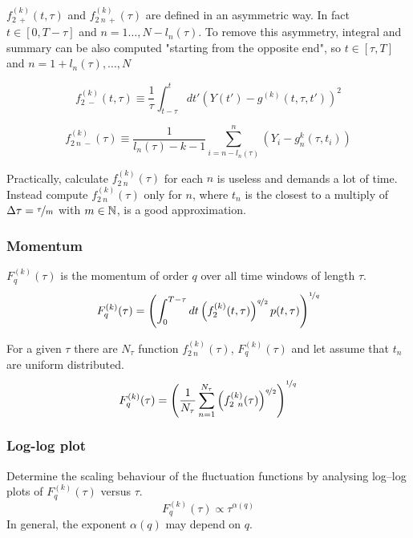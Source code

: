 $f_{2 \ +}^{( k )}( t, \tau )$ and $f_{2\ n \ +}^{( k )}( \tau )$ are defined in an asymmetric way. In fact $t \in [0, T-\tau]$ and $n = 1 \dots, N - l_n(\tau)$. 
To remove this asymmetry, integral and summary can be also computed "starting from the opposite end", so $t \in [\tau, T]$ and $n = 1 + l_n(\tau), \dots, N$

\begin{equation}
	f_{2 \ -}^{( k )}( t, \tau ) \equiv \frac{1}{\tau} \int_{t-\tau}^{t} dt' \left( Y( t' ) - g^{( k )}(t, \tau, t')  \right)^2
\end{equation}

\begin{equation}
	f_{2\ n \ -}^{( k )}( \tau ) \equiv \frac{1}{l_n(\tau) - k - 1} \sum_{i=n - l_n(\tau)}^{n} \left(Y_i - g_n^{k} (\tau, t_i) \right)
\end{equation}

Practically, calculate $f_{2\ n}^{( k )}( \tau )$ for each $n$ is useless and demands a lot of time.  Instead compute $f_{2\ n}^{( k )}( \tau )$ only for $n$, where $t_n$ is the closest to a multiply of $\Delta \tau = \nicefrac{\tau}{m}$ with $m \in \mathbb{N}$, is a good approximation.

\subsubsection{Momentum}\label{step4}
$F_q^{( k )}(\tau )$ is the momentum of order $q$ over all time windows of length $\tau$.
\begin{equation}
	F_q^{( k )} ( \tau ) =  \left(\int_0^{T-\tau} dt \left( f_2^{( k )}( t, \tau ) \right)^{\nicefrac{q}{2}} p(t, \tau)  \right)^{\nicefrac{1}{q}}
\end{equation}

For a given $\tau$ there are $N_\tau$ function $f_{2\ n}^{( k )}( \tau )$, $F_q^{( k )} ( \tau )$ and let assume that $t_n$ are uniform distributed.
\begin{equation}
	F_q^{( k )} ( \tau ) = \left( \frac{1}{N_\tau} \sum_{n=1}^{N_\tau} \left( f_{2\ n}^{( k )}( \tau ) \right)^{\nicefrac{q}{2}} \right)^{\nicefrac{1}{q}}
\end{equation}

\subsubsection{Log-log plot}\label{step5}
Determine the scaling behaviour of the fluctuation functions by analysing
log–log plots of $F_q^{( k )}(\tau )$ versus $\tau$.
\begin{equation}
	F_q^{( k )}(\tau ) \propto \tau^{\alpha(q)}
\end{equation}
In general, the exponent $\alpha(q)$ may depend on $q$. 

